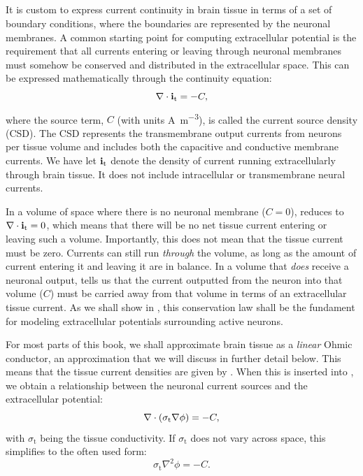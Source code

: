 \subsection{}
\label{sec:Basics:C} 
It is custom to express current continuity in brain tissue in terms of a set of boundary conditions, where the boundaries are represented by the neuronal membranes. A common starting point for computing extracellular potential is the requirement that 
all currents entering or leaving through neuronal membranes must somehow be conserved and distributed in the extracellular space. This can be expressed mathematically through the continuity equation:
\begin{equation}
{\bf \nabla} \cdot {\bf i}_\text{t} = -C, 
\label{eq:Basics:continuity1}
\end{equation}
where the source term, $C$ (with units \si{\ampere\per\cubic\metre}), is called the current source density (CSD). The CSD represents the transmembrane output currents from neurons per tissue volume and includes both the capacitive and conductive membrane currents. We have let ${\bf i}_\text{t}$ denote the density of current running extracellularly through brain tissue. It does not include intracellular or transmembrane neural currents. 

In a volume of space where there is no neuronal membrane ($C = 0$),  reduces to ${\bf \nabla} \cdot {\bf i}_\text{t} = 0$, which means that there will be no net tissue current entering or leaving such a volume. Importantly, this does not mean that the tissue current must be zero. Currents can still run \textit{through} the volume, as long as the amount of current entering it and leaving it are in balance. In a volume that \textit{does} receive a neuronal output,  tells us that the current outputted from the neuron into that volume ($C$) must be carried away from that volume in terms of an extracellular tissue current. As we shall show in , this conservation law shall be the fundament  for modeling extracellular potentials surrounding active neurons.

For most parts of this book, we shall approximate brain tissue as a \textit{linear} Ohmic conductor, an approximation that we will discuss in further detail below. This means that the tissue current densities are given by . When this is inserted into , we obtain a relationship between the neuronal current sources and the extracellular potential: 
\begin{equation}
{\bf \nabla} \cdot \left(\sigma_\text{t} {\bf \nabla} {\phi} \right) = -C, 
\label{eq:Basics:continuity2}
\end{equation}
with $\sigma_\text{t}$ being the tissue conductivity. If $\sigma_\text{t}$ does not vary across space, this simplifies to the often used form:
\begin{equation}
\sigma_\text{t} \nabla^2{\phi} = -C.
\label{eq:Basics:continuity3}
\end{equation}

